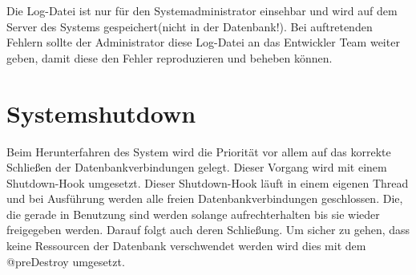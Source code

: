 \begin{itemize}
			Die Log-Datei ist nur für den Systemadministrator einsehbar und wird auf dem Server des Systems gespeichert(nicht in der Datenbank!). Bei auftretenden Fehlern sollte der Administrator diese Log-Datei an das Entwickler Team weiter geben, damit diese den Fehler reproduzieren und beheben können.
			
		\end{itemize} 
	
\section{Systemshutdown}

	Beim Herunterfahren des System wird die Priorität vor allem auf das korrekte Schließen der Datenbankverbindungen gelegt. Dieser Vorgang wird mit einem Shutdown-Hook umgesetzt. Dieser Shutdown-Hook läuft in einem eigenen Thread und bei Ausführung werden alle freien Datenbankverbindungen geschlossen. Die, die gerade in Benutzung sind werden solange aufrechterhalten bis sie wieder freigegeben werden. Darauf folgt auch deren Schließung. Um sicher zu gehen, dass keine Ressourcen der Datenbank verschwendet werden wird dies mit dem @preDestroy umgesetzt. 
   